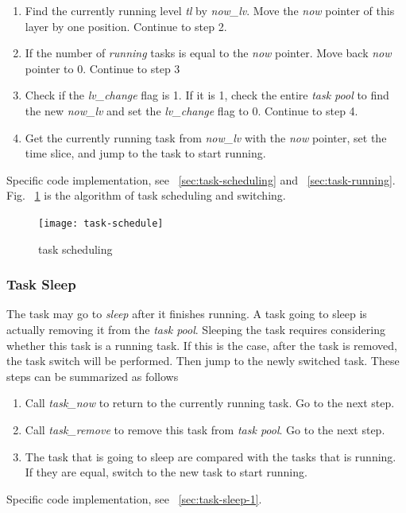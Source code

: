\documentclass{swfcthesis}
\begin{document}
\begin{enumerate}
\item Find the currently running level \emph{tl} by \emph{now\_lv}. Move the
  \emph{now} pointer of this layer by one position. Continue to step 2.
  
\item If the number of \emph{running} tasks is equal to the \emph{now} pointer. Move back
  \emph{now} pointer to 0. Continue to step 3

\item Check if the \emph{lv\_change} flag is 1. If it is 1, check the entire \emph{task
    pool} to find the new \emph{now\_lv} and set the \emph{lv\_change} flag to 0. Continue
  to step 4.

\item Get the currently running task from \emph{now\_lv} with the \emph{now} pointer, set
  the time slice, and jump to the task to start running.
  
\end{enumerate}
Specific code implementation, see ~\ref{sec:task-scheduling} and 
~\ref{sec:task-running}. Fig. ~\ref{fig:task-schd} is the algorithm of task scheduling and
switching.
\begin{figure}[!ht]
  \centering
  \texttt{[image: task-schedule]} 
  \caption{task scheduling}
  \label{fig:task-schd}
\end{figure}

\subsubsection{Task Sleep}
\label{sec:task-sleep}

The task may go to \emph{sleep} after it finishes running. A task going to sleep is
actually removing it from the \emph{task pool}. Sleeping the task requires considering
whether this task is a running task. If this is the case, after the task is removed, the
task switch will be performed. Then jump to the newly switched task. These steps can be
summarized as follows
\begin{enumerate}
\item Call \emph{task\_now} to return to the currently running task. Go to the next step.
\item Call \emph{task\_remove} to remove this task from \emph{task pool}. Go to the next step.
\item The task that is going to sleep are compared with the tasks that is running. If they
  are equal, switch to the new task to start running.
  
\end{enumerate}
Specific code implementation, see ~\ref{sec:task-sleep-1}.
\end{document}
